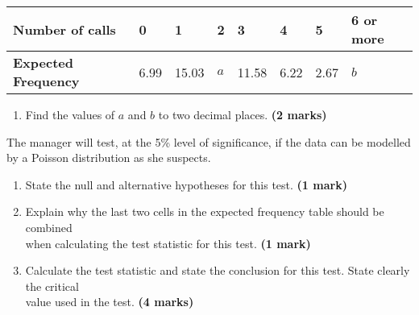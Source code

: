\documentclass[fleqn]{article}
\begin{document}
\begin{enumerate}
\begin{center}
\begin{minipage}[t]{0.85\linewidth}
\begin{tabularx}{\textwidth}{|X|*6{P{10mm}|}P{18mm}|}
                    \hline
                    \textbf{Number of calls}     & 0    & 1     & 2   & 3     & 4    & 5    & 6 or more   \\\hline
                    \textbf{Expected Frequency}  & 6.99 & 15.03 & $a$ & 11.58 & 6.22 & 2.67 & $b$         \\\hline
                \end{tabularx}
                \vspace{2mm}
            \end{minipage}
        \end{center}
        \begin{enumerate}[resume, label=\bfseries \alph*\space ]
            \item Find the values of $a$ and $b$ to two decimal places. \hfill\textbf{(2 marks)}
        \end{enumerate}\vspace{-2mm}
        The manager will test, at the 5\% level of significance, if the data can be modelled by a Poisson distribution as she suspects.
        \begin{enumerate}[resume, label=\bfseries \alph*\space ]
            \item State the null and alternative hypotheses for this test. \hfill\textbf{(1 mark)}
            \item Explain why the last two cells in the expected frequency table should be combined \\when calculating the test statistic for this test. \hfill\textbf{(1 mark)}
            \item Calculate the test statistic and state the conclusion for this test. State clearly the critical \\value used in the test. \hfill\textbf{(4 marks)}
        \end{enumerate}
        

\end{enumerate}
\end{document}
